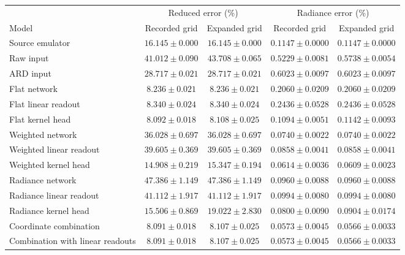 \begin{tabular}{lcccc}
\toprule
& \multicolumn{2}{c}{Reduced error (\%)} & \multicolumn{2}{c}{Radiance error (\%)} \\
\cmidrule(lr){2-3}\cmidrule(lr){4-5}
Model & Recorded grid & Expanded grid & Recorded grid & Expanded grid \\
\midrule
Source emulator & $16.145\pm0.000$ & $16.145\pm0.000$ & $0.1147\pm0.0000$ & $0.1147\pm0.0000$ \\
Raw input & $41.012\pm0.090$ & $43.708\pm0.065$ & $0.5229\pm0.0081$ & $0.5738\pm0.0054$ \\
ARD input & $28.717\pm0.021$ & $28.717\pm0.021$ & $0.6023\pm0.0097$ & $0.6023\pm0.0097$ \\
Flat network & $8.236\pm0.021$ & $8.236\pm0.021$ & $0.2060\pm0.0209$ & $0.2060\pm0.0209$ \\
Flat linear readout & $8.340\pm0.024$ & $8.340\pm0.024$ & $0.2436\pm0.0528$ & $0.2436\pm0.0528$ \\
Flat kernel head & $8.092\pm0.018$ & $8.108\pm0.025$ & $0.1094\pm0.0051$ & $0.1142\pm0.0093$ \\
Weighted network & $36.028\pm0.697$ & $36.028\pm0.697$ & $0.0740\pm0.0022$ & $0.0740\pm0.0022$ \\
Weighted linear readout & $39.605\pm0.369$ & $39.605\pm0.369$ & $0.0858\pm0.0041$ & $0.0858\pm0.0041$ \\
Weighted kernel head & $14.908\pm0.219$ & $15.347\pm0.194$ & $0.0614\pm0.0036$ & $0.0609\pm0.0023$ \\
Radiance network & $47.386\pm1.149$ & $47.386\pm1.149$ & $0.0960\pm0.0088$ & $0.0960\pm0.0088$ \\
Radiance linear readout & $41.112\pm1.917$ & $41.112\pm1.917$ & $0.0994\pm0.0080$ & $0.0994\pm0.0080$ \\
Radiance kernel head & $15.506\pm0.869$ & $19.022\pm2.830$ & $0.0800\pm0.0090$ & $0.0904\pm0.0174$ \\
Coordinate combination & $8.091\pm0.018$ & $8.107\pm0.025$ & $0.0573\pm0.0045$ & $0.0566\pm0.0033$ \\
Combination with linear readouts & $8.091\pm0.018$ & $8.107\pm0.025$ & $0.0573\pm0.0045$ & $0.0566\pm0.0033$ \\
\bottomrule
\end{tabular}
